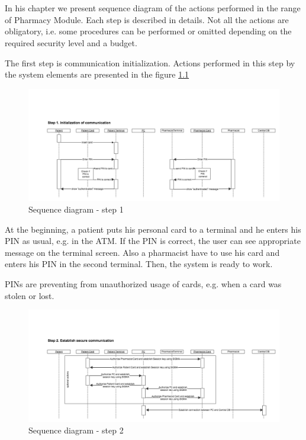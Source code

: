 \chapter{   }
In his chapter we present sequence diagram of the actions performed in the range of Pharmacy Module. Each step is described in details. Not all the actions are obligatory, i.e. some procedures can be performed or omitted depending on the required security level and a budget. 

The first step is communication initialization. Actions performed in this step by the system elements are presented in the figure \ref{fig:s_q_step_1}
\begin{figure}	
	\hspace*{-1.5in}
    \includegraphics[scale=0.45]{s_d_1.png}
    \caption{Sequence diagram - step 1}
    \label{fig:s_q_step_1}
\end{figure} 

At the beginning, a patient puts his personal card to a terminal and he enters his PIN as usual, e.g. in the ATM. If the PIN is correct, the user can see appropriate message on the terminal screen. Also a pharmacist have to use his card and enters his PIN in the second terminal. Then, the system is ready to work. 

PINs are preventing from unauthorized usage of cards, e.g. when a card was stolen or lost.


\begin{figure}	
	\hspace*{-1.5in}
    \includegraphics[scale=0.45]{s_d_2.png}
    \caption{Sequence diagram - step 2}
    \label{fig:s_q_step_2}
\end{figure} 

